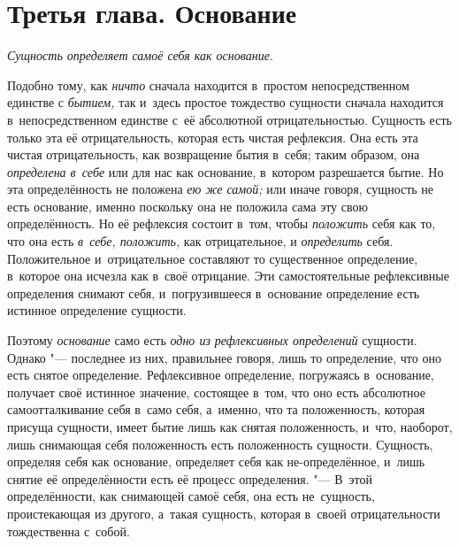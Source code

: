 \chapter[{\em Третья глава} Основание]{Третья глава. Основание}

{\em Сущность определяет самоё себя как основание}.

Подобно тому, как {\em ничто} сначала находится в~простом непосредственном
единстве с {\em бытием,} так и~здесь простое тождество сущности сначала
находится в~непосредственном единстве с~её абсолютной отрицательностью.
Сущность есть только эта её отрицательность, которая есть чистая рефлексия. Она
есть эта чистая отрицательность, как возвращение бытия в~себя; таким образом,
она {\em определена в~себе} или для нас как основание, в~котором разрешается
бытие. Но эта определённость не положена {\em ею же самой;} или иначе говоря,
сущность не есть основание, именно поскольку она не положила сама эту свою
определённость. Но её рефлексия состоит в~том, чтобы {\em положить} себя как
то, что она есть {\em в~себе, положить,} как отрицательное, и {\em определить}
себя. Положительное и~отрицательное составляют то существенное определение,
в~которое она исчезла как в~своё отрицание. Эти самостоятельные рефлексивные
определения снимают себя, и~погрузившееся в~основание определение есть истинное
определение сущности.

Поэтому {\em основание} само есть {\em одно из рефлексивных определений}
сущности. Однако "--- последнее из них, правильнее говоря, лишь то определение,
что оно есть снятое определение. Рефлексивное определение, погружаясь
в~основание, получает своё истинное значение, состоящее в~том, что оно есть
абсолютное самоотталкивание себя в~само себя, а~именно, что та положенность,
которая присуща сущности, имеет бытие лишь как снятая положенность, и~что,
наоборот, лишь снимающая себя положенность есть положенность сущности.
Сущность, определяя себя как основание, определяет себя как не-определённое,
и~лишь снятие её определённости есть её процесс определения. "--- В~этой
определённости, как снимающей самоё себя, она есть не~сущность, проистекающая
из другого, а~такая сущность, которая в~своей отрицательности тождественна
с~собой.

